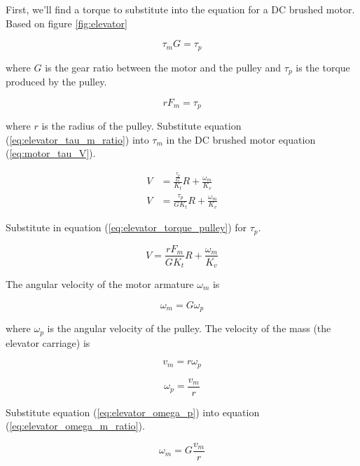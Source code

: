 First, we'll find a torque to substitute into the equation for a DC brushed
motor. Based on figure \ref{fig:elevator}

\begin{equation}
  \tau_m G = \tau_p \label{eq:elevator_tau_m_ratio}
\end{equation}

where $G$ is the gear ratio between the motor and the pulley and $\tau_p$ is the
torque produced by the pulley.

\begin{equation}
  rF_m = \tau_p \label{eq:elevator_torque_pulley}
\end{equation}

where $r$ is the radius of the pulley. Substitute equation
(\ref{eq:elevator_tau_m_ratio}) into $\tau_m$ in the DC brushed motor equation
(\ref{eq:motor_tau_V}).

\begin{align*}
  V &= \frac{\frac{\tau_p}{G}}{K_t} R + \frac{\omega_m}{K_v} \\
  V &= \frac{\tau_p}{GK_t} R + \frac{\omega_m}{K_v}
\end{align*}

Substitute in equation (\ref{eq:elevator_torque_pulley}) for $\tau_p$.

\begin{equation}
  V = \frac{rF_m}{GK_t} R + \frac{\omega_m}{K_v} \label{eq:elevator_Vinter1}
\end{equation}

The angular velocity of the motor armature $\omega_m$ is

\begin{equation}
  \omega_m = G \omega_p \label{eq:elevator_omega_m_ratio}
\end{equation}

where $\omega_p$ is the angular velocity of the pulley. The velocity of the mass
(the elevator carriage) is

\begin{equation*}
  v_m = r \omega_p
\end{equation*}

\begin{equation}
  \omega_p = \frac{v_m}{r} \label{eq:elevator_omega_p}
\end{equation}

Substitute equation (\ref{eq:elevator_omega_p}) into equation
(\ref{eq:elevator_omega_m_ratio}).

\begin{equation}
  \omega_m = G \frac{v_m}{r} \label{eq:elevator_omega_m}
\end{equation}

